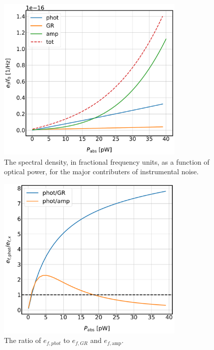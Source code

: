 \begin{figure}[!htbp]
\centering
\includegraphics[width=0.8\textwidth]{figures/kid_model/Sxx_fracfreq}
\caption[~The spectral density, in fractional frequency units, as a function of optical power, for the major contributers of instrumental noise.]{The spectral density, in fractional frequency units, as a function of optical power, for the major contributers of instrumental noise.}
\label{fig:Sxx_fracfreq}
\end{figure}

\begin{figure}[!htbp]
\centering
\includegraphics[width=0.8\textwidth]{figures/kid_model/noise_ratios}
\caption[~The simulated ratios of photon to GR and photon to amplifier noise.]{The ratio of $e_{f,phot}$ to $e_{f,GR}$ and $e_{f,\mathrm{amp}}$.}
\label{fig:noise_ratios}
\end{figure}

